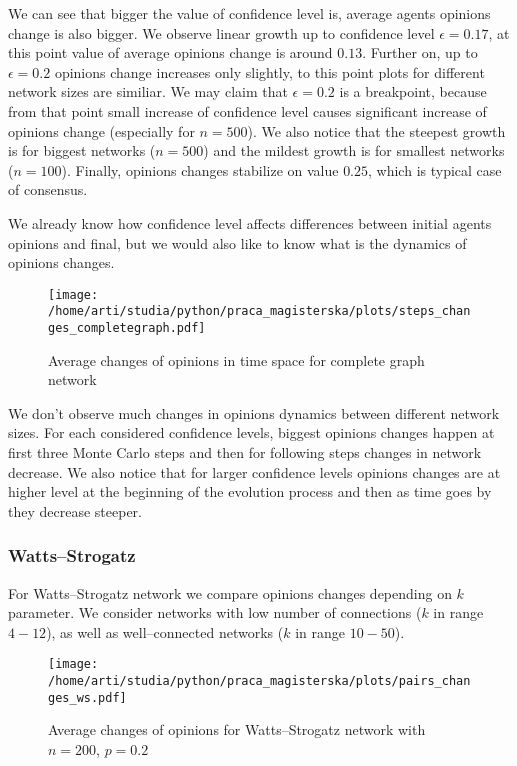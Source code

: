 \documentclass{article}
\begin{document}
We can see that bigger the value of confidence level is, average agents opinions change is also bigger. We observe linear growth up to confidence level $\epsilon=0.17$, at this point value of average opinions change is around $0.13$. Further on, up to $\epsilon=0.2$ opinions change increases only slightly, to this point plots for different network sizes are similiar. We may claim that $\epsilon=0.2$ is a breakpoint, because from that point small increase of confidence level causes significant increase of opinions change (especially for $n=500$). We also notice that the steepest growth is for biggest networks ($n=500$) and the mildest growth is for smallest networks ($n=100$). Finally, opinions changes stabilize on value $0.25$, which is typical case of consensus.

\indent

We already know how confidence level affects differences between initial agents opinions and final, but we would also like to know what is the dynamics of opinions changes.

\begin{figure}[H]
		\centering
		\texttt{[image: /home/arti/studia/python/praca\_magisterska/plots/steps\_changes\_completegraph.pdf]}
		\caption{Average changes of opinions in time space for complete graph network}
\end{figure}

We don't observe much changes in opinions dynamics between different network sizes. For each considered confidence levels, biggest opinions changes happen at first three Monte Carlo steps and then for following steps changes in network decrease. We also notice that for larger confidence levels opinions changes are at higher level at the beginning of the evolution process and then as time goes by they decrease steeper.

\subsubsection{Watts--Strogatz}

For Watts--Strogatz network we compare opinions changes depending on $k$ parameter. We consider networks with low number of connections ($k$ in range $4-12$), as well as well--connected networks ($k$ in range $10-50$).

\begin{figure}[H]
		\centering
		\texttt{[image: /home/arti/studia/python/praca\_magisterska/plots/pairs\_changes\_ws.pdf]}
		\caption{Average changes of opinions for Watts--Strogatz network with $n=200$, $p=0.2$}
\end{figure}
\end{document}

